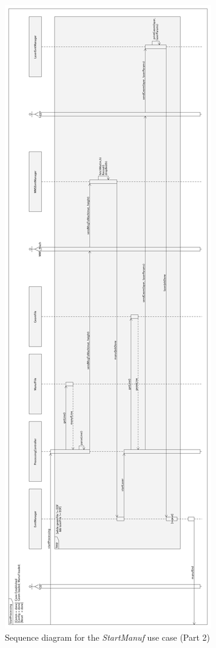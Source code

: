 \begin{figure}
  \begin{center}
    \includegraphics[height=1.0\textheight]{./img/seq-start-process-lscape.png}
  \end{center}
  \caption{Sequence diagram for the \emph{StartManuf} use case (Part 2)}\label{fig:seq-start-process-lscape}
\end{figure}
